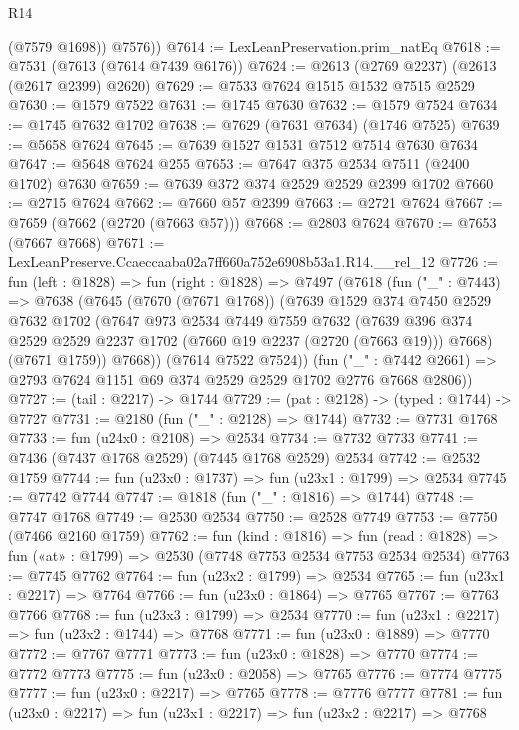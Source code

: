 \begin{lexlean}{R14}
\begin{coremodule}
          (@7579 @1698))
        @7576))
@7614 := LexLeanPreservation.prim_natEq
@7618 := @7531 (@7613 (@7614 @7439 @6176))
@7624 := @2613 (@2769 @2237) (@2613 (@2617 @2399) @2620)
@7629 := @7533 @7624 @1515 @1532 @7515 @2529
@7630 := @1579 @7522
@7631 := @1745 @7630
@7632 := @1579 @7524
@7634 := @1745 @7632 @1702
@7638 := @7629 (@7631 @7634) (@1746 @7525)
@7639 := @5658 @7624
@7645 := @7639 @1527 @1531 @7512 @7514 @7630 @7634
@7647 := @5648 @7624 @255
@7653 := @7647 @375 @2534 @7511 (@2400 @1702) @7630
@7659 := @7639 @372 @374 @2529 @2529 @2399 @1702
@7660 := @2715 @7624
@7662 := @7660 @57 @2399
@7663 := @2721 @7624
@7667 := @7659 (@7662 (@2720 (@7663 @57)))
@7668 := @2803 @7624
@7670 := @7653 (@7667 @7668)
@7671 := LexLeanPreserve.Ccaeccaaba02a7ff660a752e6908b53a1.R14.__rel_12
@7726 := fun (left : @1828) =>
  fun (right : @1828) =>
  @7497
    (@7618
      (fun ("_" : @7443) =>
      @7638
        (@7645
          (@7670 (@7671 @1768))
          (@7639
            @1529
            @374
            @7450
            @2529
            @7632
            @1702
            (@7647
              @973
              @2534
              @7449
              @7559
              @7632
              (@7639 @396 @374 @2529 @2529 @2237 @1702 (@7660 @19 @2237 (@2720 (@7663 @19))) @7668)
              (@7671 @1759))
            @7668))
        (@7614 @7522 @7524))
      (fun ("_" : @7442 @2661) => @2793 @7624 @1151 @69 @374 @2529 @2529 @1702 @2776 @7668 @2806))
@7727 := (tail : @2217) -> @1744
@7729 := (pat : @2128) -> (typed : @1744) -> @7727
@7731 := @2180 (fun ("_" : @2128) => @1744)
@7732 := @7731 @1768
@7733 := fun (u24x0 : @2108) => @2534
@7734 := @7732 @7733
@7741 := @7436 (@7437 @1768 @2529) (@7445 @1768 @2529) @2534
@7742 := @2532 @1759
@7744 := fun (u23x0 : @1737) => fun (u23x1 : @1799) => @2534
@7745 := @7742 @7744
@7747 := @1818 (fun ("_" : @1816) => @1744)
@7748 := @7747 @1768
@7749 := @2530 @2534
@7750 := @2528 @7749
@7753 := @7750 (@7466 @2160 @1759)
@7762 := fun (kind : @1816) =>
  fun (read : @1828) => fun («at» : @1799) => @2530 (@7748 @7753 @2534 @7753 @2534 @2534)
@7763 := @7745 @7762
@7764 := fun (u23x2 : @1799) => @2534
@7765 := fun (u23x1 : @2217) => @7764
@7766 := fun (u23x0 : @1864) => @7765
@7767 := @7763 @7766
@7768 := fun (u23x3 : @1799) => @2534
@7770 := fun (u23x1 : @2217) => fun (u23x2 : @1744) => @7768
@7771 := fun (u23x0 : @1889) => @7770
@7772 := @7767 @7771
@7773 := fun (u23x0 : @1828) => @7770
@7774 := @7772 @7773
@7775 := fun (u23x0 : @2058) => @7765
@7776 := @7774 @7775
@7777 := fun (u23x0 : @2217) => @7765
@7778 := @7776 @7777
@7781 := fun (u23x0 : @2217) => fun (u23x1 : @2217) => fun (u23x2 : @2217) => @7768

\end{coremodule}
\end{lexlean}
